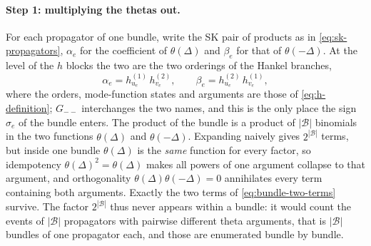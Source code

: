 \documentclass[11pt,a4paper]{article}
\numberwithin{table}{section}
\newcommand{\cB}{\mathcal B}
\begin{document}
\paragraph{Step 1: multiplying the thetas out.}
For each propagator of one bundle, write the SK pair of products as in \eqref{eq:sk-propagators},
$\alpha_e$ for the coefficient of $\theta(\Delta)$ and $\beta_e$ for that of $\theta(-\Delta)$. At
the level of the $h$ blocks the two are the two orderings of the Hankel branches,
\begin{equation}
  \alpha_e = h^{(1)}_{u_e}\,h^{(2)}_{v_e},
  \qquad
  \beta_e = h^{(2)}_{u_e}\,h^{(1)}_{v_e},
  \label{eq:bundle-alphabeta}
\end{equation}
where the orders, mode-function states and arguments are those of \eqref{eq:h-definition}; $G_{--}$ interchanges
the two names, and this is the only place the sign $\sigma_e$ of the bundle enters. The product of
the bundle is a product of $|\cB|$ binomials in the two functions $\theta(\Delta)$ and
$\theta(-\Delta)$. Expanding naively gives $2^{|\cB|}$ terms, but inside one bundle $\theta(\Delta)$ is
the \emph{same} function for every factor, so idempotency $\theta(\Delta)^2=\theta(\Delta)$ makes
all powers of one argument collapse to that argument, and orthogonality
$\theta(\Delta)\theta(-\Delta)=0$ annihilates every term containing both arguments. Exactly the two
terms of \eqref{eq:bundle-two-terms} survive. The factor $2^{|\cB|}$ thus never appears within a bundle:
it would count the events of $|\cB|$ propagators with pairwise different theta arguments, that is
$|\cB|$ bundles of one propagator each, and those are enumerated bundle by bundle.
\end{document}
